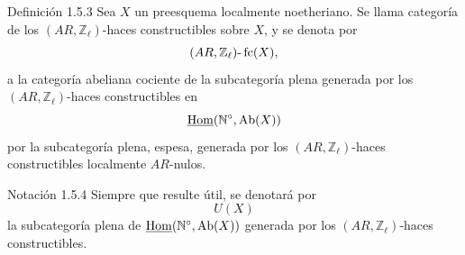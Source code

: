 \begin{statement}{Definición 1.5.3}
Sea \(X\) un preesquema localmente noetheriano. Se llama categoría de los \((AR,\mathbb Z_\ell)\)-haces constructibles sobre \(X\), y se denota por
\[
(AR,\mathbb Z_\ell)\text{-}\operatorname{fc}(X),
\]
a la categoría abeliana cociente de la subcategoría plena generada por los \((AR,\mathbb Z_\ell)\)-haces constructibles en
\[
\underline{\operatorname{Hom}}(\mathbb N^\circ,\operatorname{Ab}(X))
\]
por la subcategoría plena, espesa, generada por los \((AR,\mathbb Z_\ell)\)-haces constructibles localmente \(AR\)-nulos.
\end{statement}

\begin{statement}{Notación 1.5.4}
Siempre que resulte útil, se denotará por
\[
U(X)
\]
la subcategoría plena de \(\underline{\operatorname{Hom}}(\mathbb N^\circ,\operatorname{Ab}(X))\) generada por los \((AR,\mathbb Z_\ell)\)-haces constructibles.
\end{statement}

